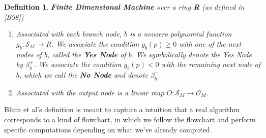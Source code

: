 \documentclass[twoside]{article}
\newcommand{\outspace}[0]{\mathcal{O}}
\newcommand{\statespace}[0]{\mathcal{S}}
\newcommand{\functype}[3]{$#1:#2 \rightarrow #3$}
\renewcommand{\cite}[1]{[#1]}
\newtheorem{definition}[theorem]{Definition}
\begin{document}
\begin{definition}{\textbf{Finite Dimensional Machine} over a ring
    \textbf{R} (as defined in \cite{B98})}
\begin{enumerate}
  \item Associated with each branch node, $b$ is a nonzero polynomial
    function \functype{g_b}{\statespace_M}{R}.  We associate the
    condition $g_b(p) \geq 0$ with one of the next nodes of $b$,
    called the \textbf{Yes Node} of $b$.  We symbolically denote the Yes Node by $\beta_b^+$. We
    associate the condition $g_b(p) < 0$ with the remaining next node of $b$, which we call the 
    \textbf{No Node} and denote $\beta_b^-$. 

  \item Associated with the output node is a linear map
    \functype{O}{\statespace_M}{\outspace_M}.

  \end{enumerate}
\end{definition}

Blum et al's definition is meant to capture a intuition that a real
algorithm corresponds to a kind of flowchart, in which we follow the
flowchart and perform specific computations depending on what we've
already computed.
\end{document}
